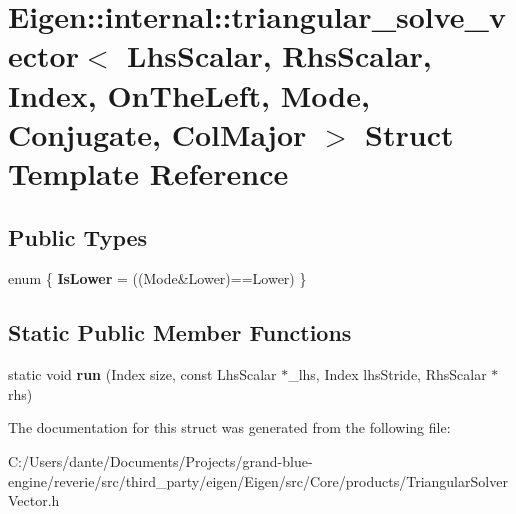 \hypertarget{struct_eigen_1_1internal_1_1triangular__solve__vector_3_01_lhs_scalar_00_01_rhs_scalar_00_01_ind063e019bb54cf6ae298090bc534a9cdf}{}\section{Eigen\+::internal\+::triangular\+\_\+solve\+\_\+vector$<$ Lhs\+Scalar, Rhs\+Scalar, Index, On\+The\+Left, Mode, Conjugate, Col\+Major $>$ Struct Template Reference}
\label{struct_eigen_1_1internal_1_1triangular__solve__vector_3_01_lhs_scalar_00_01_rhs_scalar_00_01_ind063e019bb54cf6ae298090bc534a9cdf}
\subsection*{Public Types}
\begin{DoxyCompactItemize}
\item 
\mbox{\label{struct_eigen_1_1internal_1_1triangular__solve__vector_3_01_lhs_scalar_00_01_rhs_scalar_00_01_ind063e019bb54cf6ae298090bc534a9cdf_a6898bc7b5f66e95de2b788a8d756aca1}} 
enum \{ {\bfseries Is\+Lower} = ((Mode\&Lower)==Lower)
 \}
\end{DoxyCompactItemize}
\subsection*{Static Public Member Functions}
\begin{DoxyCompactItemize}
\item 
\mbox{\label{struct_eigen_1_1internal_1_1triangular__solve__vector_3_01_lhs_scalar_00_01_rhs_scalar_00_01_ind063e019bb54cf6ae298090bc534a9cdf_af1bb92ef8bbe69c4c298a5bb9652b2ed}} 
static void {\bfseries run} (Index size, const Lhs\+Scalar $\ast$\+\_\+lhs, Index lhs\+Stride, Rhs\+Scalar $\ast$rhs)
\end{DoxyCompactItemize}


The documentation for this struct was generated from the following file\+:\begin{DoxyCompactItemize}
\item 
C\+:/\+Users/dante/\+Documents/\+Projects/grand-\/blue-\/engine/reverie/src/third\+\_\+party/eigen/\+Eigen/src/\+Core/products/Triangular\+Solver\+Vector.\+h\end{DoxyCompactItemize}
